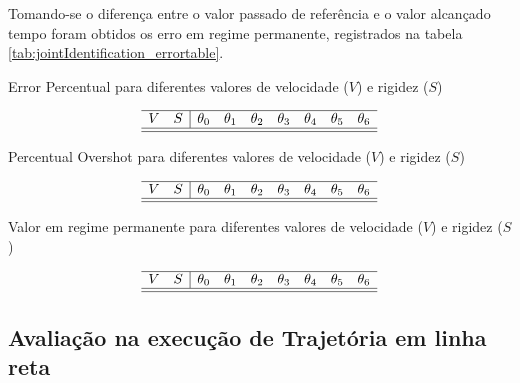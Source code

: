 Tomando-se o diferença entre o valor passado de referência e o valor alcançado tempo foram obtidos os erro em regime permanente, registrados na tabela \ref{tab:jointIdentification_errortable}.

\begin{table}[H]
    \centering
    \caption{Error Percentual para diferentes valores de velocidade ($V$) e rigidez ($S$)}
    $$\begin{array}{cc|ccccccc}
         \hline
         V & S & \theta_0 & \theta_1 & \theta_2 & \theta_3 & \theta_4 & \theta_5 & \theta_6\\
         \hline
         
         \hline
    \end{array}$$
    \label{tab:jointIdentification_errortable}
\end{table}

\begin{table}[H]
    \centering
    \caption{Percentual Overshot para diferentes valores de velocidade ($V$) e rigidez ($S$)}
    $$\begin{array}{cc|ccccccc}
         \hline
         V & S & \theta_0 & \theta_1 & \theta_2 & \theta_3 & \theta_4 & \theta_5 & \theta_6\\
         \hline
         
         \hline
    \end{array}$$
    \label{tab:jointIdentification_overshottable}
\end{table}

\begin{table}[H]
    \centering
    \caption{Valor em regime permanente para diferentes valores de velocidade ($V$) e rigidez ($S$)}
    $$\begin{array}{cc|ccccccc}
         \hline
         V & S & \theta_0 & \theta_1 & \theta_2 & \theta_3 & \theta_4 & \theta_5 & \theta_6\\
         \hline
         
         \hline
    \end{array}$$
    \label{tab:jointIdentification_steadstatetable}
\end{table}


\subsection{Avaliação na execução de Trajetória em linha reta}

